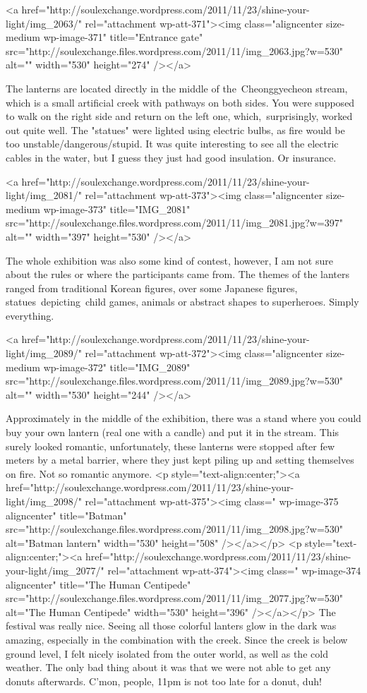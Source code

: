 \begin{post}
\begin{content}
<a href="http://soulexchange.wordpress.com/2011/11/23/shine-your-light/img_2063/" rel="attachment wp-att-371"><img class="aligncenter size-medium wp-image-371" title="Entrance gate" src="http://soulexchange.files.wordpress.com/2011/11/img_2063.jpg?w=530" alt="" width="530" height="274" /></a>

The lanterns are located directly in the middle of the Cheonggyecheon stream, which is a small artificial creek with pathways on both sides. You were supposed to walk on the right side and return on the left one, which, surprisingly, worked out quite well. The "statues" were lighted using electric bulbs, as fire would be too unstable/dangerous/stupid. It was quite interesting to see all the electric cables in the water, but I guess they just had good insulation. Or insurance.

<a href="http://soulexchange.wordpress.com/2011/11/23/shine-your-light/img_2081/" rel="attachment wp-att-373"><img class="aligncenter size-medium wp-image-373" title="IMG_2081" src="http://soulexchange.files.wordpress.com/2011/11/img_2081.jpg?w=397" alt="" width="397" height="530" /></a>

The whole exhibition was also some kind of contest, however, I am not sure about the rules or where the participants came from. The themes of the lanters ranged from traditional Korean figures, over some Japanese figures, statues depicting child games, animals or abstract shapes to superheroes. Simply everything.

<a href="http://soulexchange.wordpress.com/2011/11/23/shine-your-light/img_2089/" rel="attachment wp-att-372"><img class="aligncenter size-medium wp-image-372" title="IMG_2089" src="http://soulexchange.files.wordpress.com/2011/11/img_2089.jpg?w=530" alt="" width="530" height="244" /></a>

Approximately in the middle of the exhibition, there was a stand where you could buy your own lantern (real one with a candle) and put it in the stream. This surely looked romantic, unfortunately, these lanterns were stopped after few meters by a metal barrier, where they just kept piling up and setting themselves on fire. Not so romantic anymore.
<p style="text-align:center;"><a href="http://soulexchange.wordpress.com/2011/11/23/shine-your-light/img_2098/" rel="attachment wp-att-375"><img class=" wp-image-375 aligncenter" title="Batman" src="http://soulexchange.files.wordpress.com/2011/11/img_2098.jpg?w=530" alt="Batman lantern" width="530" height="508" /></a></p>
<p style="text-align:center;"><a href="http://soulexchange.wordpress.com/2011/11/23/shine-your-light/img_2077/" rel="attachment wp-att-374"><img class=" wp-image-374 aligncenter" title="The Human Centipede" src="http://soulexchange.files.wordpress.com/2011/11/img_2077.jpg?w=530" alt="The Human Centipede" width="530" height="396" /></a></p>
The festival was really nice. Seeing all those colorful lanters glow in the dark was amazing, especially in the combination with the creek. Since the creek is below ground level, I felt nicely isolated from the outer world, as well as the cold weather. The only bad thing about it was that we were not able to get any donuts afterwards. C'mon, people, 11pm is not too late for a donut, duh!


\end{content}
\end{post}
